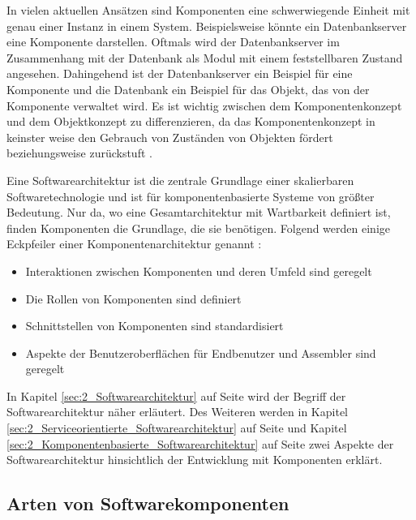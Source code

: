 In vielen aktuellen Ansätzen sind Komponenten eine schwerwiegende Einheit mit genau einer Instanz in einem System. Beispielsweise könnte ein Datenbankserver eine Komponente darstellen. Oftmals wird der Datenbankserver im Zusammenhang mit der Datenbank als Modul mit einem feststellbaren Zustand angesehen. Dahingehend ist der Datenbankserver ein Beispiel für eine Komponente und die Datenbank ein Beispiel für das Objekt, das von der Komponente verwaltet wird. Es ist wichtig zwischen dem Komponentenkonzept und dem Objektkonzept zu differenzieren, da das Komponentenkonzept in keinster weise den Gebrauch von Zuständen von Objekten fördert beziehungsweise zurückstuft \citereset \autocite{Szyperski.2002}.

Eine Softwarearchitektur ist die zentrale Grundlage einer skalierbaren Softwaretechnologie und ist für komponentenbasierte Systeme von größter Bedeutung. Nur da, wo eine Gesamtarchitektur mit Wartbarkeit definiert ist, finden Komponenten die Grundlage, die sie benötigen. Folgend werden einige Eckpfeiler einer Komponentenarchitektur genannt \citereset \autocite{Szyperski.2002}:
\begin{itemize}
\item Interaktionen zwischen Komponenten und deren Umfeld sind geregelt
\item Die Rollen von Komponenten sind definiert
\item Schnittstellen von Komponenten sind standardisiert
\item Aspekte der Benutzeroberflächen für Endbenutzer und Assembler sind geregelt
\end{itemize}
In Kapitel \ref{sec:2_Softwarearchitektur} auf Seite \pageref{sec:2_Softwarearchitektur} wird der Begriff der Softwarearchitektur näher erläutert. Des Weiteren werden in Kapitel \ref{sec:2_Serviceorientierte_Softwarearchitektur} auf Seite \pageref{sec:2_Serviceorientierte_Softwarearchitektur} und Kapitel \ref{sec:2_Komponentenbasierte_Softwarearchitektur} auf Seite \pageref{sec:2_Komponentenbasierte_Softwarearchitektur} zwei Aspekte der Softwarearchitektur hinsichtlich der Entwicklung mit Komponenten erklärt.



\subsection{Arten von Softwarekomponenten}
\label{sec:2_Arten_Komponenten}

